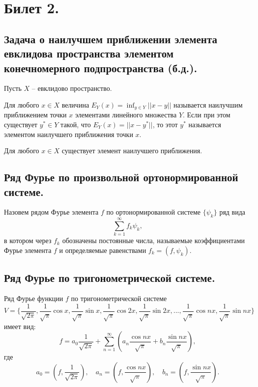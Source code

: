 \section{Билет 2.}

\subsection{Задача о наилучшем приближении элемента евклидова пространства элементом конечномерного подпространства (б.д.).}
Пусть $X$ -- евклидово пространство.
\begin{definition}
    Для любого $x \in X$ величина $E_Y(x) = \inf_{y \in Y} ||x - y||$ называется наилучшим приближением точки $x$ элементами линейного множества $Y$. Если при этом существует $y^* \in Y$ такой, что $E_Y(x) = ||x - y^*||$, то этот $y^*$ называется элементом наилучшего приближения точки $x$.
\end{definition}
\begin{theorem}
    Для любого $x \in X$ существует элемент наилучшего приближения.
\end{theorem}

\subsection{Ряд Фурье по произвольной ортонормированной системе.}
\begin{definition}
    Назовем рядом Фурье элемента $f$ по ортонормированной системе $\{\psi_k\}$ ряд вида
    \[
        \sum_{k=1}^{\infty} f_k \psi_k,
    \]
    в котором через $f_k$ обозначены постоянные числа, называемые коэффициентами Фурье элемента $f$ и определяемые равенствами $f_k = (f, \psi_k)$.
\end{definition}
\subsection{Ряд Фурье по тригонометрической системе.}
Ряд Фурье функции $f$ по тригонометрической системе $$V = \{\frac{1}{\sqrt{2\pi}}, \frac{1}{\sqrt{\pi}} \cos x, \frac{1}{\sqrt{\pi}} \sin x, \frac{1}{\sqrt{\pi}} \cos 2x, \frac{1}{\sqrt{\pi}} \sin 2x, ..., \frac{1}{\sqrt{\pi}} \cos nx, \frac{1}{\sqrt{\pi}} \sin nx \}$$ имеет вид:
\[
    f = a_0\frac{1}{\sqrt{2\pi}} +  \sum_{n=1}^{\infty} \left(
        a_n \frac{\cos nx}{\sqrt{\pi}} + b_n \frac{\sin nx}{\sqrt{\pi}}
    \right),
\]
где
\[
    a_0 = \left(
        f, \frac{1}{\sqrt{2 \pi}}
    \right),
    \quad
    a_n = \left(
        f, \frac{\cos nx}{\sqrt{\pi}}
    \right),
    \quad
    b_n = \left(
        f, \frac{\sin nx}{\sqrt{\pi}}
    \right).
\]
